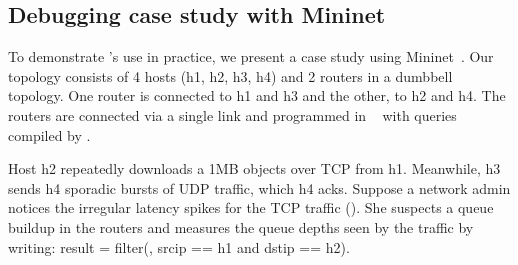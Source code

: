 
\subsection{Debugging case study with Mininet}
\label{s:eval:mininet}
\label{sec:eval:mininet}

To demonstrate \TheSystem's use in practice, we present a case study using
Mininet~\cite{mininet}.
Our topology consists of 4 hosts ({\ct h1, h2, h3, h4}) and 2 routers in a dumbbell topology.
One router is connected to {\ct h1} and {\ct h3}
and the other, to {\ct h2} and {\ct h4}.
The routers are connected via a single link and
programmed in \pfs~\cite{p4-bmv2} with queries compiled by \TheSystem.

Host {\ct h2} repeatedly downloads a 1MB objects over TCP from {\ct h1}.
Meanwhile, {\ct h3} sends {\ct h4} sporadic bursts of UDP traffic, which {\ct h4} acks.
Suppose a network admin notices the irregular latency
spikes for the TCP traffic (). She suspects a queue buildup
in the routers and measures the queue depths seen by the traffic by writing:
{\ct result = filter(\pktlog, srcip == h1 and dstip == h2).}


